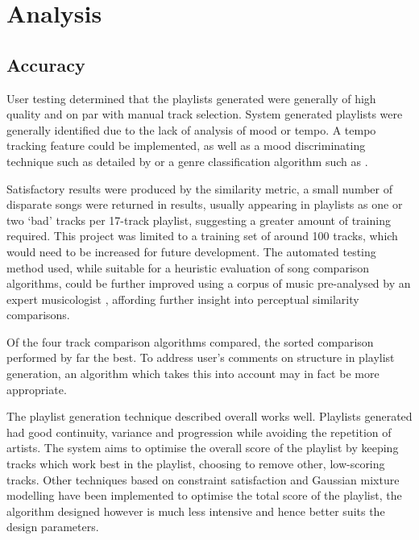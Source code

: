 \section{Analysis}
\subsection{Accuracy}
User testing determined that the playlists generated were generally of high quality and on par with manual track selection. System generated playlists were generally identified due to the lack of analysis of mood or tempo. A tempo tracking feature could be implemented, as well as a mood discriminating technique such as detailed by \citet*{Liu2003} or a genre classification algorithm such as \citet*{Basili2004}.

Satisfactory results were produced by the similarity metric, a small number of disparate songs were returned in results, usually appearing in playlists as one or two `bad' tracks per 17-track playlist, suggesting a greater amount of training required. This project was limited to a training set of around 100 tracks, which would need to be increased for future development. The automated testing method used, while suitable for a heuristic evaluation of song comparison algorithms, could be further improved using a corpus of music pre-analysed by an expert musicologist \citep{Muellensiefen2004}, affording further insight into perceptual similarity comparisons.

Of the four track comparison algorithms compared, the sorted comparison performed by far the best. To address user's comments on structure in playlist generation, an algorithm which takes this into account may in fact be more appropriate.

The playlist generation technique described overall works well. Playlists generated had good continuity, variance and progression while avoiding the repetition of artists. The system aims to optimise the overall score of the playlist by keeping tracks which work best in the playlist, choosing to remove other, low-scoring tracks. Other techniques based on constraint satisfaction \citep{Vossen2005} and Gaussian mixture modelling \citep{Aucouturier2003} have been implemented to optimise the total score of the playlist, the algorithm designed however is much less intensive and hence better suits the design parameters.
